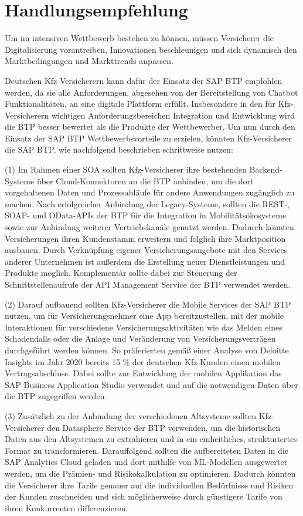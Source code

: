\chapter{Handlungsempfehlung}

Um im intensiven Wettbewerb bestehen zu können, müssen Versicherer die Digitalisierung  vorantreiben, Innovationen beschleunigen und sich dynamisch den Marktbedingungen und Markttrends anpassen.

Deutschen Kfz-Versicherern kann dafür der Einsatz der SAP BTP empfohlen werden, da sie alle Anforderungen, abgesehen von der Bereitstellung von Chatbot Funktionalitäten, an eine digitale Plattform erfüllt. Insbesondere in den für Kfz-Versicherern wichtigen Anforderungsbereichen Integration und Entwicklung wird die BTP besser bewertet als die Produkte der Wettbewerber. Um nun durch den Einsatz der SAP BTP Wettbewerbsvorteile zu erzielen, könnten Kfz-Versicherer die SAP BTP, wie nachfolgend beschrieben schrittweise nutzen:

(1) Im Rahmen einer SOA sollten Kfz-Versicherer ihre bestehenden Backend-Systeme über Cloud-Konnektoren an die BTP anbinden, um die dort vorgehaltenen Daten und Prozessabläufe für andere Anwendungen zugänglich zu machen. Nach erfolgreicher Anbindung der Legacy-Systeme, sollten die REST-, SOAP- und OData-APIs der BTP für die Integration in Mobilitätsökosysteme sowie zur Anbindung weiterer Vertriebskanäle genutzt werden. Dadurch könnten Versicherungen ihren Kundenstamm erweitern und folglich ihre Marktposition ausbauen. Durch Verknüpfung eigener Versicherungsangebote mit den Services anderer Unternehmen ist außerdem die Erstellung neuer Dienstleistungen und Produkte möglich. Komplementär sollte dabei zur Steuerung der Schnittstellenaufrufe der API Management Service der BTP verwendet werden.

(2) Darauf aufbauend sollten Kfz-Versicherer die Mobile Services der SAP BTP nutzen, um für Versicherungsnehmer eine App bereitzustellen, mit der mobile Interaktionen für verschiedene Versicherungsaktivitäten wie das Melden eines Schadendalls oder die Anlage und Veränderung von Versicherungsverträgen durchgeführt werden können. So präferierten gemäß einer Analyse von Deloitte Insights im Jahr 2020 bereits 15 \% der deutschen Kfz-Kunden einen mobilen Vertragsabschluss.\autocite[Vgl.][S. 15]{BAUMANN2020} Dabei sollte zur Entwicklung der mobilen Applikation das SAP Business Application Studio verwendet und auf die notwendigen Daten über die BTP zugegriffen werden. 

(3) Zusätzlich zu der Anbindung der verschiedenen Altsysteme sollten Kfz- Versicherer den Datasphere Service der BTP verwenden, um die historischen Daten aus den Altsystemen zu extrahieren und in ein einheitliches, strukturiertes Format zu transformieren. Darauffolgend sollten die aufbereiteten Daten in die SAP Analytics Cloud geladen und dort mithilfe von ML-Modellen ausgewertet werden, um die Prämien- und Risikokalkulation zu optimieren. Dadurch könnten die Versicherer ihre Tarife genauer auf die individuellen Bedürfnisse und Risiken der Kunden zuschneiden und sich möglicherweise durch günstigere Tarife von ihren Konkurrenten differenzieren.

